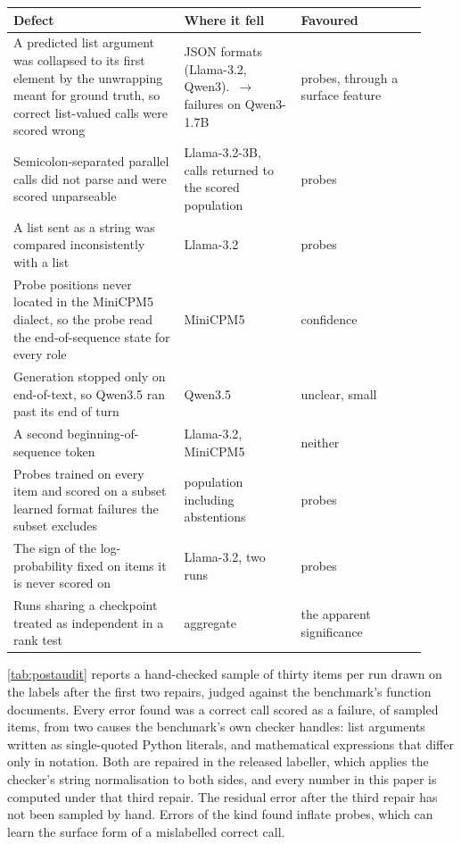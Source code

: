 \begin{center}\small
\begin{tabular}{p{0.38\linewidth}p{0.26\linewidth}p{0.28\linewidth}}
\toprule
Defect & Where it fell & Favoured \\
\midrule
A predicted list argument was collapsed to its first element by the unwrapping meant for ground truth, so correct list-valued calls were scored wrong & JSON formats (Llama-3.2, Qwen3). \repPosBeforeQwenThreeBfcl{}\,$\to$\,\repPosAfterQwenThreeBfcl{} failures on Qwen3-1.7B & probes, through a surface feature \\
Semicolon-separated parallel calls did not parse and were scored unparseable & Llama-3.2-3B, \repParallelLlamaThreeBBfcl{} calls returned to the scored population & probes \\
A list sent as a string was compared inconsistently with a list & Llama-3.2 & probes \\
Probe positions never located in the MiniCPM5 dialect, so the probe read the end-of-sequence state for every role & MiniCPM5 & confidence \\
Generation stopped only on end-of-text, so Qwen3.5 ran past its end of turn & Qwen3.5 & unclear, small \\
A second beginning-of-sequence token & Llama-3.2, MiniCPM5 & neither \\
Probes trained on every item and scored on a subset learned format failures the subset excludes & population including abstentions & probes \\
The sign of the log-probability fixed on items it is never scored on & Llama-3.2, two runs & probes \\
Runs sharing a checkpoint treated as independent in a rank test & aggregate & the apparent significance \\
\bottomrule
\end{tabular}
\end{center}

\cref{tab:postaudit} reports a hand-checked sample of thirty items per run drawn on the labels after the first two repairs, judged against the benchmark's function documents. Every error found was a correct call scored as a failure, \auditPooledErr{} of \auditPooledN{} sampled items, from two causes the benchmark's own checker handles: list arguments written as single-quoted Python literals, and mathematical expressions that differ only in notation. Both are repaired in the released labeller, which applies the checker's string normalisation to both sides, and every number in this paper is computed under that third repair. The residual error after the third repair has not been sampled by hand. Errors of the kind found inflate probes, which can learn the surface form of a mislabelled correct call.


